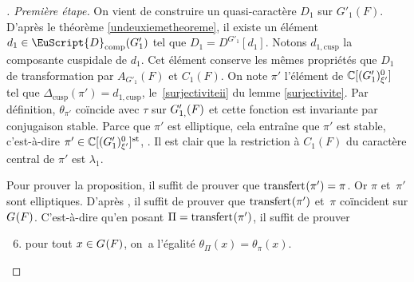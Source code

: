 \documentclass[JEP,XML,SOM,Unicode,francais]{cedram}
\let\mathcal \EuScript
\newcommand{\NoChangel}[1]{%
\expandafter\let\csname old\string#1\endcsname=#1
\let#1=\relax
\newcommand{#1}{\mathcode`l="716C\csname old\string#1\endcsname\mathcode`l="7160 }%
}
\newcommand{\comp}{\mathrm{comp}}
\newcommand{\cusp}{\mathrm{cusp}}
\newcommand{\rell}{\mathrm{ell}} \NoChangel{\rell}
\newcommand{\Ell}{\mathrm{Ell}} \NoChangel{\Ell}
\newcommand{\st}{\mathrm{st}}
\DeclareMathOperator{\transfert}{transfert}
\newcommand{\cD}{\mathcal{D}}
\newcommand{\CC}{\mathbb{C}}
\theoremstyle{plain}
\theoremstyle{definition}
\begin{document}
\begin{proof}[\proofname. Première étape]
On vient de construire un quasi-caractère $D_{1}$ sur $G'_{1}(F)$. D'après le théorème \ref{undeuxiemetheoreme}, il existe un élément $d_{1}\in \cD_{\comp}(G'_{1})$ tel que $D_{1}=D^{G'_{1}}[d_{1}]$. Notons $d_{1,\cusp}$ la composante cuspidale de $d_{1}$. Cet élément conserve les mêmes propriétés que $D_{1}$ de transformation par $A_{G'_{1}}(F)$ et $C_{1}(F)$. On note $\pi'$ l'élément de $\CC[\Ell(G'_{1})_{\xi'}^0]$ tel que $\Delta_{\cusp}(\pi')=d_{1,\cusp}$, \cf le~\eqref{surjectiviteii} du lemme \ref{surjectivite}. Par définition, $\theta_{\pi'}$ coïncide avec $\tau$ sur $G'_{1,\rell}(F)$ et cette fonction est invariante par conjugaison stable. Parce que $\pi'$ est elliptique, cela entraîne que $\pi'$ est stable, c'est-à-dire $\pi'\in \CC[\Ell(G'_{1})_{\xi'}^0]^{\st}$, \cf \cite[Th.\,6.1]{A3}.
Il est clair que la restriction à $C_{1}(F)$ du caractère central de $\pi'$ est $\lambda_{1}$.

Pour prouver la proposition, il suffit de prouver que $\transfert_{\rell}(\pi')=\pi$. Or $\pi$ et~$\pi'$ sont elliptiques. D'après \cite[Th.\,6.2]{A3}, il suffit de prouver que $\transfert_{\rell}(\pi')$ et~$\pi$ coïncident sur $G_{\rell}(F)$. C'est-à-dire qu'en posant $\Pi=\transfert_{\rell}(\pi')$,
il suffit de prouver
\begin{enumerate}\setcounter{enumi}{5}
\item\label{unereciproque6}
pour tout $x\in G_{\rell}(F)$, on~a l'égalité $\theta_{\Pi}(x)=\theta_{\pi}(x)$.
\end{enumerate}


\end{proof}
\end{document}
